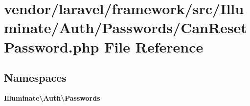 \section{vendor/laravel/framework/src/\+Illuminate/\+Auth/\+Passwords/\+Can\+Reset\+Password.php File Reference}
\label{_auth_2_passwords_2_can_reset_password_8php}
\subsection*{Namespaces}
\begin{DoxyCompactItemize}
\item 
 {\bf Illuminate\textbackslash{}\+Auth\textbackslash{}\+Passwords}
\end{DoxyCompactItemize}
